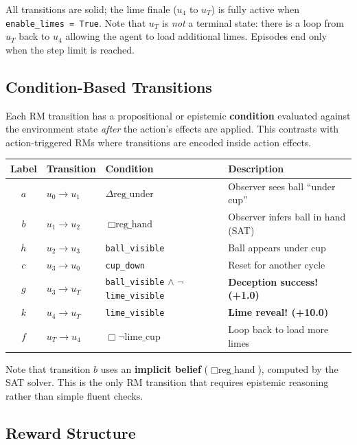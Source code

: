 \documentclass[11pt]{article}
\newcommand{\EBel}[1]{\ensuremath{\Delta #1}} %
\newcommand{\IBel}[1]{\ensuremath{\Box #1}}   %
\begin{document}
All transitions are solid; the lime finale ($u_4$ to $u_T$) is fully active when \texttt{enable\_limes = True}. Note that $u_T$ is \emph{not} a terminal state: there is a loop from $u_T$ back to $u_4$ allowing the agent to load additional limes. Episodes end only when the step limit is reached.

\subsection{Condition-Based Transitions}

Each RM transition has a propositional or epistemic \textbf{condition} evaluated against the environment state \emph{after} the action's effects are applied. This contrasts with action-triggered RMs where transitions are encoded inside action effects.

\begin{center}
\begin{tabular}{clll}
\toprule
\textbf{Label} & \textbf{Transition} & \textbf{Condition} & \textbf{Description} \\
\midrule
$a$ & $u_0 \to u_1$ & $\EBel{\text{reg\_under}}$ & Observer sees ball ``under cup'' \\
$b$ & $u_1 \to u_2$ & $\IBel{\text{reg\_hand}}$ & Observer infers ball in hand (SAT) \\
$h$ & $u_2 \to u_3$ & \texttt{ball\_visible} & Ball appears under cup \\
$c$ & $u_3 \to u_0$ & \texttt{cup\_down} & Reset for another cycle \\
$g$ & $u_3 \to u_T$ & \texttt{ball\_visible} $\land$ $\neg$\texttt{lime\_visible} & \textbf{Deception success! (+1.0)} \\
\midrule
$k$ & $u_4 \to u_T$ & \texttt{lime\_visible} & \textbf{Lime reveal! (+10.0)} \\
$f$ & $u_T \to u_4$ & $\IBel{\neg\text{lime\_cup}}$ & Loop back to load more limes \\
\bottomrule
\end{tabular}
\end{center}

Note that transition $b$ uses an \textbf{implicit belief} ($\IBel{\text{reg\_hand}}$), computed by the SAT solver. This is the only RM transition that requires epistemic reasoning rather than simple fluent checks.

\subsection{Reward Structure}
\end{document}
